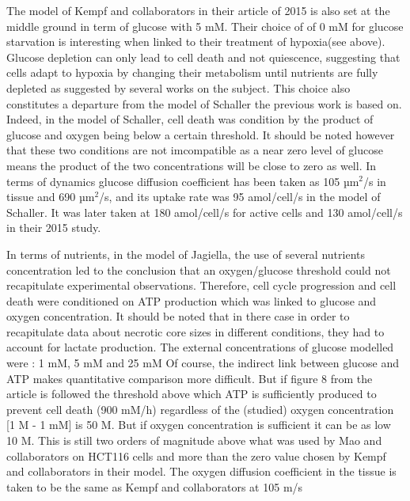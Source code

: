 \documentclass[11pt,a4paper]{article}
\begin{document}
The model of Kempf and collaborators in their article of 2015 is also set at the middle ground in term of glucose with 5 mM. Their choice of of 0 mM for glucose starvation is interesting when linked to their treatment of hypoxia(see above). Glucose depletion can only lead to cell death and not quiescence, suggesting that cells adapt to hypoxia by changing their metabolism until nutrients are fully depleted as suggested by several works on the subject.\cite{Rodriguez2008} This choice also constitutes a departure from the model of Schaller the previous work is based on. Indeed, in the model of Schaller, cell death was condition by the product of glucose and oxygen being below a certain threshold. It should be noted however that these two conditions are not imcompatible as a near zero level of glucose means the product of the two concentrations will be close to zero as well. In terms of dynamics glucose diffusion coefficient has been taken as 105 µm$^2$/s in tissue and 690 µm$^2$/s, and its uptake rate was 95 amol/cell/s in the model of Schaller. It was later taken at 180 amol/cell/s for active cells and 130 amol/cell/s in their 2015 study.

In terms of nutrients, in the model of Jagiella, the use of several nutrients concentration led to the conclusion that an oxygen/glucose threshold could not recapitulate experimental observations. Therefore, cell cycle progression and cell death were conditioned on ATP production which was linked to glucose and oxygen concentration. It should be noted that in there case in order to recapitulate data about necrotic core sizes in different conditions, they had to account for lactate production. The external concentrations of glucose modelled were : 1 mM, 5 mM and 25 mM Of course, the indirect link between glucose and ATP makes quantitative comparison more difficult. But if figure 8 from the article is followed the threshold above which ATP is sufficiently produced to prevent cell death (900 mM/h) regardless of the (studied) oxygen concentration [1 \textmu M - 1 mM] is 50 \textmu M. But if oxygen concentration is sufficient it can be as low 10 \textmu M. This is still two orders of magnitude above what was used by Mao and collaborators on HCT116 cells and more than the zero value chosen by Kempf and collaborators in their model. The oxygen diffusion coefficient in the tissue is taken to be the same as Kempf and collaborators at 105 \textmu m/s
\end{document}
